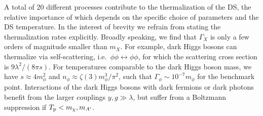 A total of 20 different processes contribute to the thermalization of the \ac{DS}, the relative importance of which depends on the specific choice of parameters and the \ac{DS} temperature. In the interest of brevity we refrain from stating the thermalization
rates explicitly. Broadly speaking, we find that $\Gamma_X$ is only a few orders of magnitude smaller than $m_X$. For example, dark Higgs bosons can thermalize via  self-scattering, i.e.~$\phi \phi \leftrightarrow \phi \phi$, for which the scattering cross section is
$9 \lambda^2 / (8 \pi s)$. For temperatures comparable to the dark Higgs boson mass, we have $s \approx 4 m_\phi^2$ and $n_\phi \approx \zeta(3) m_\phi^3 / \pi^2$, such that $\Gamma_\phi \sim 10^{-7} m_\phi$ for the benchmark point. Interactions of the dark Higgs bosons with dark fermions or dark photons benefit from the larger couplings $y, g \gg \lambda$, but suffer from a Boltzmann suppression if $T_{\text{p}} < m_\chi, m_{A'}$.

